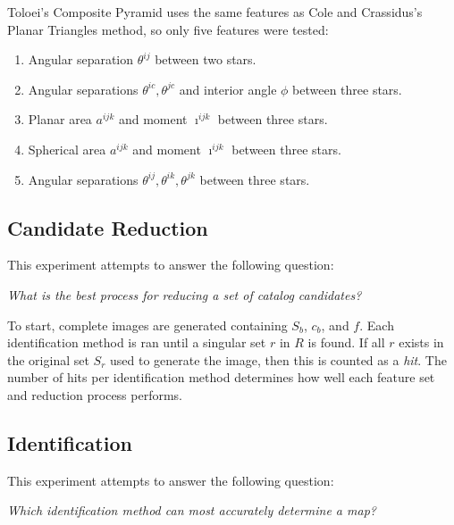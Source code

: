 Toloei's Composite Pyramid uses the same features as Cole and Crassidus's Planar Triangles method, so only five
features were tested:
\begin{enumerate}
    \item Angular separation $\theta^{ij}$ between two stars.
    \item Angular separations $\theta^{ic}, \theta^{jc}$ and interior angle $\phi$ between three stars.
    \item Planar area $a^{ijk}$ and moment $\imath^{ijk}$ between three stars.
    \item Spherical area $a^{ijk}$ and moment $\imath^{ijk}$ between three stars.
    \item Angular separations $\theta^{ij}, \theta^{ik}, \theta^{jk}$ between three stars.
\end{enumerate}

\subsection{Candidate Reduction}\label{subsec:candidateReductionMethods}
This experiment attempts to answer the following question:
\begin{displayquote}
    \textit{What is the best process for reducing a set of catalog candidates?}
\end{displayquote}

To start, complete images are generated containing $S_b$, $c_b$, and $f$.
Each identification method is ran until a singular set $r$ in $R$ is found.
If all $r$ exists in the original set $S_r$ used to generate the image, then this is counted as a \textit{hit}.
The number of hits per identification method determines how well each feature set and reduction process performs.

\subsection{Identification}\label{subsec:identificationMethods}
This experiment attempts to answer the following question:
\begin{displayquote}
    \textit{Which identification method can most accurately determine a map?}
\end{displayquote}